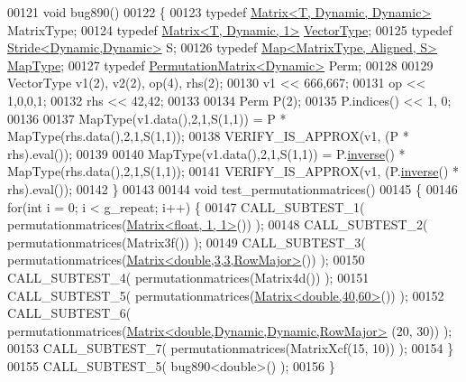\begin{DoxyCode}
00121 \textcolor{keywordtype}{void} bug890()
00122 \{
00123   \textcolor{keyword}{typedef} \hyperlink{group___core___module_class_eigen_1_1_matrix}{Matrix<T, Dynamic, Dynamic>} MatrixType;
00124   \textcolor{keyword}{typedef} \hyperlink{group___core___module_class_eigen_1_1_matrix}{Matrix<T, Dynamic, 1>} \hyperlink{struct_vector_type}{VectorType};
00125   \textcolor{keyword}{typedef} \hyperlink{group___core___module_class_eigen_1_1_stride}{Stride<Dynamic,Dynamic>} S;
00126   \textcolor{keyword}{typedef} \hyperlink{group___core___module_class_eigen_1_1_map}{Map<MatrixType, Aligned, S>} \hyperlink{group___core___module_class_eigen_1_1_map}{MapType};
00127   \textcolor{keyword}{typedef} \hyperlink{group___core___module_class_eigen_1_1_permutation_matrix}{PermutationMatrix<Dynamic>} Perm;
00128   
00129   VectorType v1(2), v2(2), op(4), rhs(2);
00130   v1 << 666,667;
00131   op << 1,0,0,1;
00132   rhs << 42,42;
00133   
00134   Perm P(2);
00135   P.indices() << 1, 0;
00136 
00137   MapType(v1.data(),2,1,S(1,1)) = P * MapType(rhs.data(),2,1,S(1,1));
00138   VERIFY\_IS\_APPROX(v1, (P * rhs).eval());
00139   
00140   MapType(v1.data(),2,1,S(1,1)) = P.\hyperlink{group___geometry___module_a20ca137b84f18b9c41a0fef9c222e0da}{inverse}() * MapType(rhs.data(),2,1,S(1,1));
00141   VERIFY\_IS\_APPROX(v1, (P.\hyperlink{group___geometry___module_a20ca137b84f18b9c41a0fef9c222e0da}{inverse}() * rhs).eval());
00142 \}
00143 
00144 \textcolor{keywordtype}{void} test\_permutationmatrices()
00145 \{
00146   \textcolor{keywordflow}{for}(\textcolor{keywordtype}{int} i = 0; i < g\_repeat; i++) \{
00147     CALL\_SUBTEST\_1( permutationmatrices(\hyperlink{group___core___module_class_eigen_1_1_matrix}{Matrix<float, 1, 1>}()) );
00148     CALL\_SUBTEST\_2( permutationmatrices(Matrix3f()) );
00149     CALL\_SUBTEST\_3( permutationmatrices(\hyperlink{group___core___module_class_eigen_1_1_matrix}{Matrix<double,3,3,RowMajor>}()) );
00150     CALL\_SUBTEST\_4( permutationmatrices(Matrix4d()) );
00151     CALL\_SUBTEST\_5( permutationmatrices(\hyperlink{group___core___module_class_eigen_1_1_matrix}{Matrix<double,40,60>}()) );
00152     CALL\_SUBTEST\_6( permutationmatrices(\hyperlink{group___core___module_class_eigen_1_1_matrix}{Matrix<double,Dynamic,Dynamic,RowMajor>}
      (20, 30)) );
00153     CALL\_SUBTEST\_7( permutationmatrices(MatrixXcf(15, 10)) );
00154   \}
00155   CALL\_SUBTEST\_5( bug890<double>() );
00156 \}
\end{DoxyCode}
